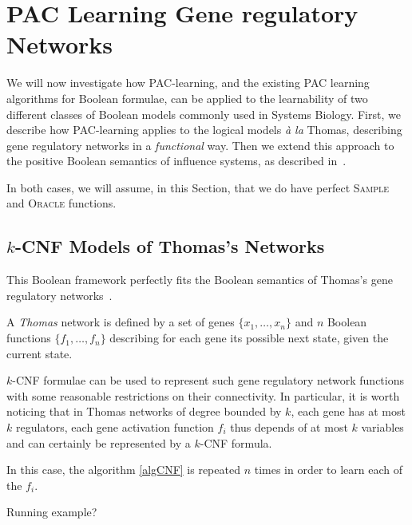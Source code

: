 \documentclass{llncs}
\begin{document}
\section{PAC Learning Gene regulatory Networks}

We will now investigate how PAC-learning, and the existing PAC learning algorithms for Boolean formulae,
can be applied to the
learnability of two different classes of Boolean models commonly used in
Systems Biology. First, we describe how PAC-learning applies to the
logical models \emph{\`a la} Thomas, describing gene regulatory networks in a
\emph{functional} way. Then we extend this approach to the positive Boolean semantics of influence systems, as described in~\cite{FMRS16cmsb}.

In both cases, we will assume, in this Section, that we do have perfect
\textsc{Sample} and \textsc{Oracle} functions.

\subsection{$k$-CNF Models of Thomas's Networks}

This Boolean framework perfectly fits the Boolean semantics of Thomas's gene
regulatory networks~\cite{Thomas73jtb}.

\begin{definition}
   A \emph{Thomas} network is defined by a set of genes $\{x_1,\dots,x_n\}$
   and $n$ Boolean functions $\{f_1,\dots,f_n\}$ describing for each gene its
   possible next state, given the current state.
\end{definition}



$k$-CNF formulae can be used to represent such gene regulatory network functions with some reasonable restrictions on their connectivity.
In particular, it is worth noticing that in Thomas networks of degree bounded by $k$,
each gene has at most $k$ regulators, each gene activation function $f_i$ thus depends of at most $k$ variables
and can certainly be represented by a $k$-CNF formula.

In this case, the algorithm \ref{algCNF} is repeated $n$ times in order to learn each of the $f_i$.

\begin{example}
   Running example?
\end{example}
\end{document}
